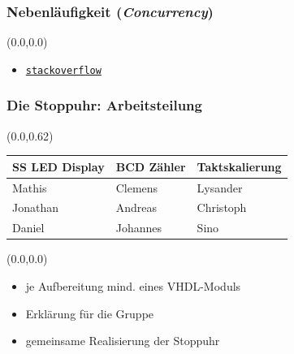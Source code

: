 \documentclass[aspectratio=169, 14pt]{beamer}
\begin{document}
\begin{frame}
    \frametitle{Nebenläufigkeit (\textit{Concurrency})}
    \begin{textblock*}{2\paperwidth}(0.0\paperwidth,0.0\paperheight)
        \vspace*{2.0cm}
        \begin{itemize}
            \setlength\itemsep{16pt}
            \item \textcolor{uniblau}{\href{https://stackoverflow.com/questions/13954193/is-process-in-vhdl-reentrant/}{\texttt{stackoverflow}}}
        \end{itemize}
    \end{textblock*}
    \framenumber
\end{frame}


\begin{frame}
    \frametitle{Die Stoppuhr: Arbeitsteilung}
    \begin{textblock*}{\paperwidth}(0.0\paperwidth,0.62\paperheight)
        {\fontsize{12}{10}\selectfont
        \begin{tabular}{C{0.31\paperwidth}C{0.31\paperwidth}C{0.36\paperwidth}}
        \toprule
        \toprule
        SS LED Display  &   BCD Zähler   &   Taktskalierung  \\%
        \midrule
        Mathis          &   Clemens      &   Lysander        \\
        Jonathan        &   Andreas      &   Christoph       \\
        Daniel          &   Johannes     &   Sino            \\
        \bottomrule
        \bottomrule
        \end{tabular}
        }
    \end{textblock*}
    \begin{textblock*}{1\paperwidth}(0.0\paperwidth,0.0\paperheight)
        \vspace*{2.0cm}
        \begin{itemize}
            \setlength\itemsep{16pt}
            \item je Aufbereitung mind. eines VHDL-Moduls
            \item Erklärung für die Gruppe
            \item gemeinsame Realisierung der Stoppuhr
        \end{itemize}
    \end{textblock*}
    \framenumber
\end{frame}
\end{document}
